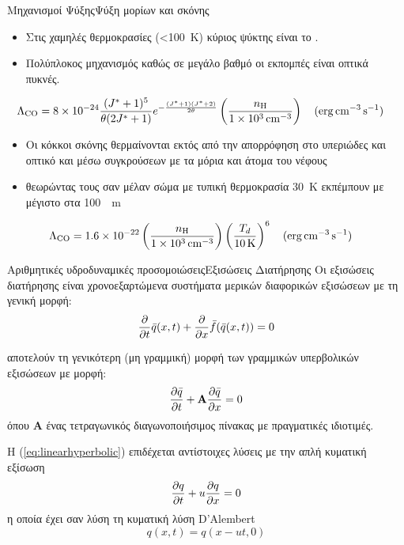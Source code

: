 \documentclass{beamer}
\begin{document}
\begin{frame}{Μηχανισμοί Ψύξης}{Ψύξη μορίων και σκόνης}
	\begin{itemize}
		\item{Στις χαμηλές θερμοκρασίες (<\SI{100}{K}) κύριος ψύκτης είναι το .}
		\item{Πολύπλοκος μηχανισμός καθώς σε μεγάλο βαθμό οι εκπομπές είναι οπτικά πυκνές.}
	\end{itemize}
	\begin{equation}
	\Lambda _{\ce{CO}}=\num{8e-24} \frac{(J^*+1)^5}{\theta (2J^*+1)} e^{-\frac{(J^*+1)(J^*+2)}{2\theta}}
	\left( \frac{n_{\ce{H}}}{\SI{1e3}{cm^{-3}}} \right)  \qq{(\si{erg.cm^{-3}.s^{-1}})} 
	\end{equation}

	\begin{itemize}
		\item{Οι κόκκοι σκόνης θερμαίνονται εκτός από την απορρόφηση στο υπεριώδες και οπτικό και μέσω συγκρούσεων με τα μόρια και άτομα του νέφους}
		\item{θεωρώντας τους σαν  μέλαν σώμα με τυπική θερμοκρασία \SI{30}{K} εκπέμπουν με μέγιστο στα \SI{100}{\mu m}}
	\end{itemize}
	\begin{equation}
	\Lambda _{\ce{CO}}=\num{1.6e-22} \left( \frac{n_{\ce{H}}}{\SI{1e3}{cm^{-3}}} \right) 
	\left( \frac{T_d}{\SI{10}{K}} \right)^6  \qq{(\si{erg.cm^{-3}.s^{-1}})} 
	\end{equation}
\end{frame}

\begin{frame}{Αριθμητικές υδροδυναμικές προσομοιώσεις}{Εξισώσεις Διατήρησης}
	Οι εξισώσεις διατήρησης είναι χρονοεξαρτώμενα συστήματα μερικών διαφορικών εξισώσεων με τη γενική μορφή:
	\begin{equation}
	\label{eq:hyperbolicconservation}
	\pdv{t} \bar{q}(x,t) + \pdv{x} \bar{f}(\bar{q}(x,t)) = 0 
	\end{equation}
	
	αποτελούν τη γενικότερη (μη γραμμική) μορφή των γραμμικών υπερβολικών εξισώσεων με μορφή:
	\begin{equation}
	\label{eq:linearhyperbolic}
	\pdv{\bar{q}}{t} +  \mathbf{A}\pdv{\bar{q}}{x}  = 0 
	\end{equation}
	όπου $\mathbf{A}$ ένας τετραγωνικός διαγωνοποιήσιμος πίνακας με πραγματικές ιδιοτιμές.
	
Η (\ref{eq:linearhyperbolic}) επιδέχεται αντίστοιχες λύσεις με την απλή κυματική εξίσωση
	\begin{equation}
	\label{eq:simple_advection}
	\pdv{q}{t} +  u\pdv{q}{x}  = 0 
	\end{equation}
	η οποία έχει σαν λύση τη κυματική λύση D'Alembert
	\begin{equation}
	q(x,t)=q(x-ut,0)
	\end{equation}
\end{frame}
\end{document}
